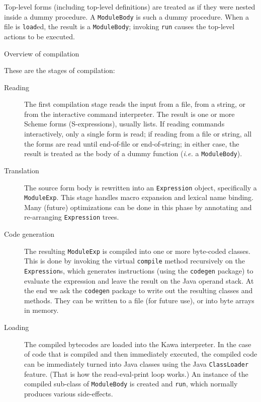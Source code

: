 \documentclass[twocolumn]{article}
\makeatletter
\def\section{\@startsection {section}{1}{\z@}
   {14pt plus 2pt minus 2pt}{12pt plus 2pt minus 2pt} {\large\bf}}
\makeatother
\begin{document}
Top-level forms (including top-level definitions) are
treated as if they were nested inside a dummy procedure.
A {\tt ModuleBody} is such a dummy procedure.
When a file is {\tt load}ed, the result is a {\tt ModuleBody};
invoking {\tt run} causes the top-level actions to be executed.

\section{Overview of compilation}

These are the stages of compilation:
\begin{description}
\item[Reading]  The first compilation stage reads the input
from a file, from a string,
or from the interactive command interpreter.
The result is one or more Scheme forms (S-expressions), usually lists.
If reading commands interactively, only a single form is read;
if reading from a file or string, all the forms are read until
end-of-file or end-of-string;  in either case, the result is treated
as the body of a dummy function ({\it i.e.} a {\tt ModuleBody}).
\item[Translation] The source form body is rewritten into an
{\tt Expression} object, specifically a {\tt ModuleExp}.
This stage handles macro expansion and lexical name binding.
Many (future) optimizations can be done in this phase by annotating
and re-arranging {\tt Expression} trees.
\item[Code generation]  The resulting {\tt ModuleExp} is compiled into
one or more byte-coded classes.
This is done by invoking the virtual {\tt compile}
method recursively on the {\tt Expression}s, which generates
instructions (using the {\tt codegen} package) to evaluate the
expression and leave the result on the Java operand stack.
At the end we ask the {\tt codegen} package to write out the resulting
classes and methods.  They can be written to a file (for
future use), or into byte arrays in memory.
\item[Loading]  The compiled bytecodes are loaded into the Kawa
interpreter.  In the case of code that is compiled and then
immediately executed, the compiled code can be immediately
turned into Java classes using the Java {\tt ClassLoader} feature.
(That is how the read-eval-print loop works.)
An instance of the compiled sub-class of {\tt ModuleBody}
is created and {\tt run}, which normally produces various side-effects.
\end{description}
\end{document}

